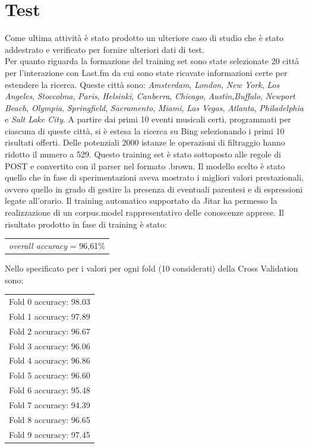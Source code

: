 \documentclass[a4paper]{report}
\begin{document}
\section{Test}
Come ultima attività è stato prodotto un ulteriore caso di studio che è stato addestrato e verificato per fornire ulteriori dati di test. \\
Per quanto riguarda la formazione del training set sono state selezionate 20 città per l'interazione con Last.fm da cui sono state ricavate informazioni certe per estendere la ricerca. Queste città sono:  \textit{Amsterdam}, \textit{London}, \textit{New York}, \textit{Los Angeles}, \textit{Stoccolma}, \textit{Paris}, \textit{Helsinki}, \textit{Canberra}, \textit{Chicago}, \textit{Austin},\textit{Buffalo}, \textit{Newport Beach}, \textit{Olympia}, \textit{Springfield}, \textit{Sacramento}, \textit{Miami}, \textit{Las Vegas}, \textit{Atlanta}, \textit{Philadelphia} e \textit{Salt Lake City}. A partire dai primi 10 eventi musicali certi, programmati per ciascuna di queste città, si è estesa la ricerca su Bing selezionando i primi 10 risultati offerti. Delle potenziali 2000 istanze le operazioni di filtraggio hanno ridotto il numero a 529. Questo training set è stato sottoposto alle regole di POST e convertito con il parser nel formato .brown. Il modello scelto è stato quello che in fase di sperimentazioni aveva mostrato i migliori valori prestazionali, ovvero quello in grado di gestire la presenza di eventuali parentesi e di espressioni legate all'orario. Il training automatico supportato da Jitar ha permesso la realizzazione di un corpus.model rappresentativo delle conoscenze apprese.  Il risultato prodotto in fase di training è stato:
\begin{center}
\begin{tabular}{c}
\textit{overall accuracy} = 96,61\%\\
\end{tabular}
\end{center}
Nello specificato per i valori per ogni fold (10 considerati) della Cross Validation sono:
\begin{center}
\begin{tabular}{c}
Fold 0 accuracy: 98.03 \\ 
Fold 1 accuracy: 97.89 \\ 
Fold 2 accuracy: 96.67 \\ 
Fold 3 accuracy: 96.06 \\ 
Fold 4 accuracy: 96.86 \\ 
Fold 5 accuracy: 96.60 \\
Fold 6 accuracy: 95.48 \\
Fold 7 accuracy: 94.39 \\
Fold 8 accuracy: 96.65 \\
Fold 9 accuracy: 97.45 \\
\end{tabular}
\end{center}
\end{document}

